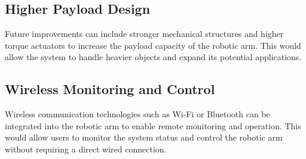 \subsection{Higher Payload Design}

Future improvements can include stronger mechanical structures and higher
torque actuators to increase the payload capacity of the robotic arm. This
would allow the system to handle heavier objects and expand its potential
applications.

\subsection{Wireless Monitoring and Control}

Wireless communication technologies such as Wi-Fi or Bluetooth can be
integrated into the robotic arm to enable remote monitoring and operation.
This would allow users to monitor the system status and control the robotic
arm without requiring a direct wired connection.


